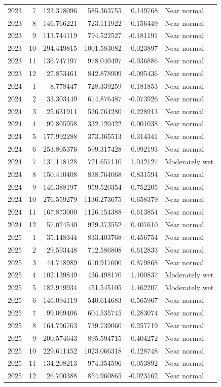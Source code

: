 \begin{tabular}{rrrrrl}
2023 & 7 & 123.318096 & 585.363755 & 0.149768 & Near normal \\
2023 & 8 & 146.766221 & 723.111922 & 0.156449 & Near normal \\
2023 & 9 & 113.744119 & 794.522527 & -0.181191 & Near normal \\
2023 & 10 & 294.449815 & 1001.583082 & 0.023897 & Near normal \\
2023 & 11 & 136.747197 & 978.040497 & -0.036886 & Near normal \\
2023 & 12 & 27.853461 & 842.878909 & -0.095436 & Near normal \\
2024 & 1 & 8.778447 & 728.339259 & -0.181853 & Near normal \\
2024 & 2 & 33.303449 & 614.876487 & -0.073926 & Near normal \\
2024 & 3 & 25.631911 & 526.764280 & 0.228913 & Near normal \\
2024 & 4 & 99.805958 & 332.120422 & 0.001038 & Near normal \\
2024 & 5 & 177.992288 & 373.365513 & 0.314341 & Near normal \\
2024 & 6 & 253.805376 & 599.317428 & 0.992193 & Near normal \\
2024 & 7 & 131.118128 & 721.657110 & 1.042127 & Moderately wet \\
2024 & 8 & 150.410408 & 838.764068 & 0.831594 & Near normal \\
2024 & 9 & 146.388197 & 959.520354 & 0.752205 & Near normal \\
2024 & 10 & 276.559279 & 1136.273675 & 0.658379 & Near normal \\
2024 & 11 & 167.873000 & 1126.154388 & 0.613854 & Near normal \\
2024 & 12 & 57.024540 & 929.373552 & 0.407610 & Near normal \\
2025 & 1 & 35.148344 & 833.403768 & 0.456754 & Near normal \\
2025 & 2 & 29.593448 & 712.586808 & 0.612833 & Near normal \\
2025 & 3 & 44.718989 & 610.917600 & 0.879868 & Near normal \\
2025 & 4 & 102.139849 & 436.498170 & 1.100837 & Moderately wet \\
2025 & 5 & 182.919934 & 451.545105 & 1.462207 & Moderately wet \\
2025 & 6 & 146.094119 & 540.614683 & 0.565967 & Near normal \\
2025 & 7 & 99.069406 & 604.535745 & 0.283074 & Near normal \\
2025 & 8 & 164.796763 & 739.739060 & 0.257719 & Near normal \\
2025 & 9 & 200.574643 & 895.594715 & 0.404272 & Near normal \\
2025 & 10 & 229.611452 & 1023.066318 & 0.128748 & Near normal \\
2025 & 11 & 134.208213 & 974.354596 & -0.053892 & Near normal \\
2025 & 12 & 26.700388 & 854.960865 & -0.023162 & Near normal \\
\bottomrule
\end{tabular}

